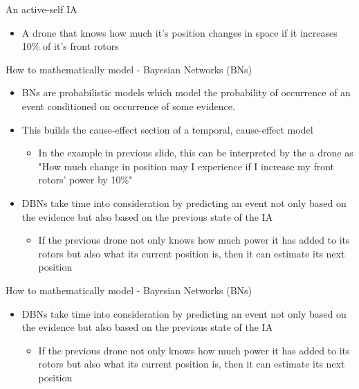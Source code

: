 \documentclass[unknownkeysallowed]{beamer}
\begin{document}
\begin{frame}{An active-self IA}
	\begin{itemize}		
		\item A drone that knows how much it's position changes in space if it increases 10\% of it's front rotors
	\end{itemize}
\end{frame}

\begin{frame}{How to mathematically model - Bayesian Networks (BNs)}
	\begin{itemize}
		\item BNs are probabilistic models which model the probability of occurrence of an event conditioned on occurrence of some evidence. \item This builds the cause-effect section of a temporal, cause-effect model
			\begin{itemize}
				\item In the example in previous slide, this can be interpreted by the a drone as "How much change in position may I experience if I increase my front rotors' power by 10\%"
			\end{itemize} 
		\item DBNs take time into consideration by predicting an event not only based on the evidence but also based on the previous state of the IA 
			\begin{itemize}
				\item If the previous drone not only knows how much power it has added to its rotors but also what its current position is, then it can estimate its next position
			\end{itemize}
	\end{itemize}
\end{frame}


\begin{frame}{How to mathematically model - Bayesian Networks (BNs)}
	\begin{itemize}
		\item DBNs take time into consideration by predicting an event not only based on the evidence but also based on the previous state of the IA 
		\begin{itemize}
			\item If the previous drone not only knows how much power it has added to its rotors but also what its current position is, then it can estimate its next position
		\end{itemize}
	\end{itemize}
\end{frame}
\end{document}
